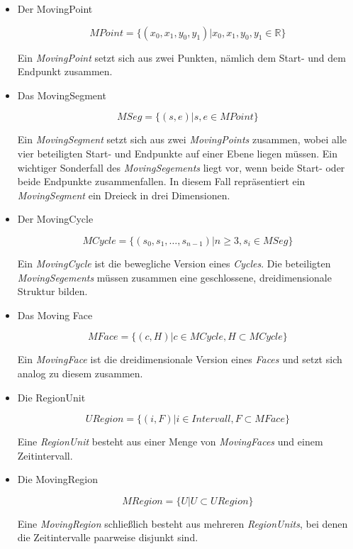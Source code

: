 \begin{itemize}

\item Der MovingPoint

$$MPoint=\{(x_0,x_1,y_0,y_1)|x_0,x_1,y_0,y_1\in \mathbb{R}\}$$

Ein \textit{MovingPoint} setzt sich aus zwei Punkten, nämlich dem Start- und dem Endpunkt zusammen.

\item Das MovingSegment 

$$MSeg=\{(s,e)|s,e\in MPoint\}$$

Ein \textit{MovingSegment} setzt sich aus zwei \textit{MovingPoints} zusammen, wobei alle vier beteiligten Start- und Endpunkte auf einer Ebene liegen müssen. Ein wichtiger Sonderfall des \textit{MovingSegements} liegt vor, wenn beide Start- oder beide Endpunkte zusammenfallen. In diesem Fall repräsentiert ein \textit{MovingSegment} ein Dreieck in drei Dimensionen.

\item Der MovingCycle 

$$MCycle=\{(s_0,s_1,\hdots ,s_{n-1})|n\geq3, s_i\in MSeg\}$$

Ein \textit{MovingCycle} ist die bewegliche Version eines \textit{Cycles}. Die beteiligten \textit{MovingSegements} müssen zusammen eine geschlossene, dreidimensionale Struktur bilden.

\item Das Moving Face 

$$MFace=\{(c,H)|c\in MCycle, H\subset MCycle\}$$

Ein \textit{MovingFace} ist die dreidimensionale Version eines \textit{Faces} und setzt sich analog zu diesem zusammen.

\item Die RegionUnit 

$$URegion=\{(i,F)|i\in Intervall, F\subset MFace\}$$

Eine \textit{RegionUnit} besteht aus einer Menge von \textit{MovingFaces} und einem Zeitintervall. 

\item Die MovingRegion 

$$MRegion=\{U|U\subset URegion\}$$

Eine \textit{MovingRegion} schließlich besteht aus mehreren \textit{RegionUnits}, bei denen die Zeitintervalle paarweise disjunkt sind.
\end{itemize}
